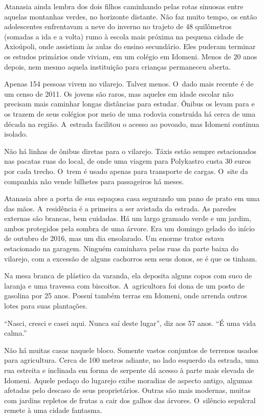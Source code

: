  

Atanasia ainda lembra dos dois filhos caminhando pelas rotas sinuosas
entre aquelas montanhas verdes, no horizonte distante. Não faz muito
tempo, os então adolescentes enfrentavam a neve do inverno no trajeto de
48 quilômetros (somadas a ida e a volta) rumo à escola mais próxima na
pequena cidade de Axioúpoli, onde assistiam às aulas do ensino
secundário. Eles puderam terminar os estudos primários onde viviam, em
um colégio em Idomeni. Menos de 20 anos depois, nem mesmo aquela
instituição para crianças permaneceu aberta.

Apenas 154 pessoas vivem no vilarejo. Talvez menos. O~dado mais recente
é de um censo de 2011. Os jovens são raros, mas aqueles em idade escolar
não precisam mais caminhar longas distâncias para estudar. Ônibus os
levam para e os trazem de seus colégios por meio de uma rodovia
construída há cerca de uma década na região. A~estrada facilitou o
acesso ao povoado, mas Idomeni continua isolado.

Não há linhas de ônibus diretas para o vilarejo. Táxis estão sempre
estacionados nas pacatas ruas do local, de onde uma viagem para
Polykastro custa 30 euros por cada trecho. O~trem é usado apenas para
transporte de cargas. O~site da companhia não vende bilhetes para
passageiros há meses.

Atanasia abre a porta de sua espaçosa casa segurando um pano de prato em
uma das mãos. A~residência é a primeira a ser avistada da estrada. As
paredes externas são brancas, bem cuidadas. Há um largo gramado verde e
um jardim, ambos protegidos pela sombra de uma árvore. Era um domingo
gelado do início de outubro de 2016, mas um dia ensolarado. Um enorme
trator estava estacionado na garagem. Ninguém caminhava pelas ruas da
parte baixa do vilarejo, com a excessão de alguns cachorros sem seus
donos, se é que os tinham.

Na mesa branca de plástico da varanda, ela deposita alguns copos com
suco de laranja e uma travessa com biscoitos. A~agricultora foi dona de
um posto de gasolina por 25 anos. Possuí também terras em Idomeni, onde
arrenda outros lotes para suas plantações.

``Nasci, cresci e casei aqui. Nunca saí deste lugar'', diz aos 57 anos.
``É uma vida calma.''

Não há muitas casas naquele bloco. Somente vastos conjuntos de terrenos
usados para agricultura. Cerca de 100 metros adiante, no lado esquerdo
da estrada, uma rua estreita e inclinada em forma de serpente dá acesso
à parte mais elevada de Idomeni. Aquele pedaço do lugarejo exibe
moradias de aspecto antigo, algumas afetadas pelo descaso de seus
proprietários. Outras são mais modernas, muitas com jardins repletos de
frutas a cair dos galhos das árvores. O~silêncio sepulcral remete à uma
cidade fantasma.

